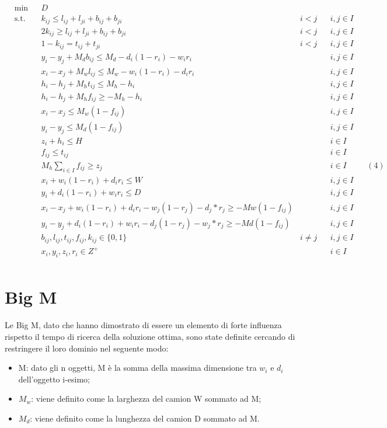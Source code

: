 \begin{equation*}
    \begin{aligned}
    & \underset{}{\text{min}}
    & & D \\
    & \text{s.t.} & & k_{ij} \leq l_{ij} + l_{ji} + b_{ij} + b_{ji} & i < j && i,j \in I \\
    & & & 2 k_{ij} \geq l_{ij} + l_{ji} + b_{ij} + b_{ji} & i < j && i,j \in I \\
    & & & 1 - k_{ij} = t_{ij} + t_{ji} & i < j && i,j \in I \\
    & & & y_i - y_j + M_d b_{ij} \leq M_d - d_i (1 - r_i) - w_i r_i & & & i,j \in I \\
    & & & x_i - x_j + M_w l_{ij} \leq M_w - w_i (1 - r_i) - d_i r_i & & & i,j \in I \\
    & & & h_i - h_j + M_h t_{ij} \leq M_h - h_i & & & i,j \in I \\
    & & & h_i - h_j + M_h f_{ij} \geq - M_h - h_i & & & i,j \in I \\
    & & & x_i - x_j \leq M_w (1-f_{ij}) & & & i,j \in I \\
    & & & y_i - y_j \leq M_d (1-f_{ij}) & & & i,j \in I \\
    & & & z_i + h_i \leq H & & & i \in I \\
    & & & f_{ij} \leq t_{ij} & & & i \in I \\
    & & & M_h \sum_{i \in I} f_{ij} \geq z_j  & & & i \in I & & (4) \\
    & & & x_i + w_i (1 - r_i) + d_i r_i \leq W & & & i,j \in I \\
    & & & y_i + d_i (1 - r_i) + w_i r_i \leq D & & & i,j \in I \\
    & & & x_i - x_j + w_i(1-r_i) + d_i r_i - w_j(1-r_j) - d_j*r_j \geq - Mw(1 - f_{ij}) & & & i,j \in I\\
    & & & y_i - y_j + d_i(1-r_i) + w_i r_i - d_j(1-r_j) - w_j*r_j \geq - Md(1 - f_{ij}) & & & i,j \in I\\
    & & & b_{ij}, l_{ij}, t_{ij}, f_{ij}, k_{ij} \in \{0,1\} & i \neq j & & i,j \in I \\
    & & & x_{i}, y_{i}, z_{i}, r_{i} \in Z^{+} & & & i \in I \\
    \end{aligned}
\end{equation*}

\section{Big M}
Le Big M, dato che hanno dimostrato di essere un elemento di forte influenza rispetto il tempo di ricerca della soluzione ottima, sono state definite cercando di restringere il loro dominio nel seguente modo:
\begin{itemize}
    \item M: dato gli n oggetti, M è la somma della massima dimensione tra $w_i$ e $d_i$ dell'oggetto i-esimo;
    \item $M_w$: viene definito come la larghezza del camion W sommato ad M;
    \item $M_d$: viene definito come la lunghezza del camion D sommato ad M.
\end{itemize}
